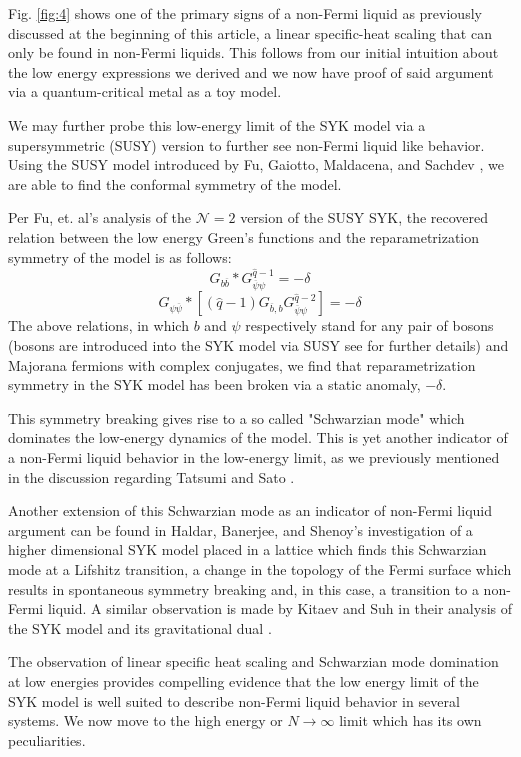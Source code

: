 \documentclass[reprint]{revtex4-2}
\begin{document}
Fig. \ref{fig:4} shows one of the primary signs of a non-Fermi liquid as previously discussed at the beginning of this article, a linear specific-heat scaling that can only be found in non-Fermi liquids. This follows from our initial intuition about the low energy expressions we derived and we now have proof of said argument via a quantum-critical metal as a toy model.
\par We may further probe this low-energy limit of the SYK model via a supersymmetric (SUSY) version to further see non-Fermi liquid like behavior. Using the SUSY model introduced by Fu, Gaiotto, Maldacena, and Sachdev \cite{Fu_2017}, we are able to find the conformal symmetry of the model. 
\par Per Fu, et. al's analysis of the $\mathcal{N} = 2$ version of the SUSY SYK, the recovered relation between the low energy Green's functions and the reparametrization symmetry of the model is as follows:
\begin{equation}
    G_{b\overline{b}} \ast G_{\overline{\psi}\psi}^{\hat{q} - 1} = - \delta
\end{equation}
\begin{equation}
    G_{\psi \overline{\psi}} \ast [(\hat{q} - 1)G_{\overline{b},b}G_{\overline{\psi}\psi}^{\hat{q}-2}] = -\delta
\end{equation}
The above relations, in which $b$ and $\psi$ respectively stand for any pair of bosons (bosons are introduced into the SYK model via SUSY see \cite{Maldacena_2016} for further details) and Majorana fermions with complex conjugates, we find that reparametrization symmetry in the SYK model has been broken via a static anomaly, $- \delta$.
\par This symmetry breaking gives rise to a so called "Schwarzian mode" which dominates the low-energy dynamics of the model. This is yet another indicator of a non-Fermi liquid behavior in the low-energy limit, as we previously mentioned in the discussion regarding Tatsumi and Sato \cite{Tatsumi_2009}. 
\par Another extension of this Schwarzian mode as an indicator of non-Fermi liquid argument can be found in Haldar, Banerjee, and Shenoy's \cite{Haldar_2018} investigation of a higher dimensional SYK model placed in a lattice which finds this Schwarzian mode at a Lifshitz transition, a change in the topology of the Fermi surface which results in spontaneous symmetry breaking and, in this case, a transition to a non-Fermi liquid. A similar observation is made by Kitaev and Suh in their analysis of the SYK model and its gravitational dual \cite{Kitaev_2018}.
\par The observation of linear specific heat scaling and Schwarzian mode domination at low energies provides compelling evidence that the low energy limit of the SYK model is well suited to describe non-Fermi liquid behavior in several systems. We now move to the high energy or $N \rightarrow \infty$ limit which has its own peculiarities. 
\end{document}
